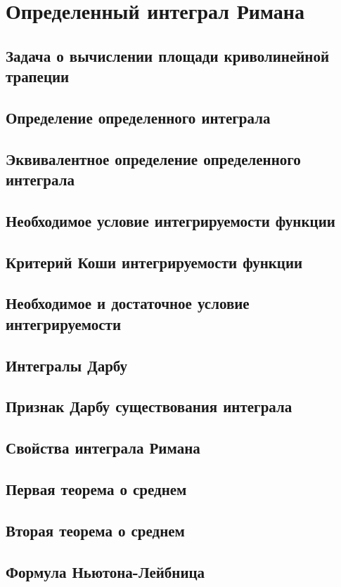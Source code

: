 \section{Определенный интеграл Римана}
\subsection{Задача о вычислении площади криволинейной трапеции}

\subsection{Определение определенного интеграла}

\subsection{Эквивалентное определение определенного интеграла}
\subsection{Необходимое условие интегрируемости функции}
\subsection{Критерий Коши интегрируемости функции}
\subsection{Необходимое и достаточное условие интегрируемости}
\subsection{Интегралы Дарбу}
\subsection{Признак Дарбу существования интеграла}
\subsection{Свойства интеграла Римана}
\subsection{Первая теорема о среднем}
\subsection{Вторая теорема о среднем} 
\subsection{Формула Ньютона-Лейбница}
